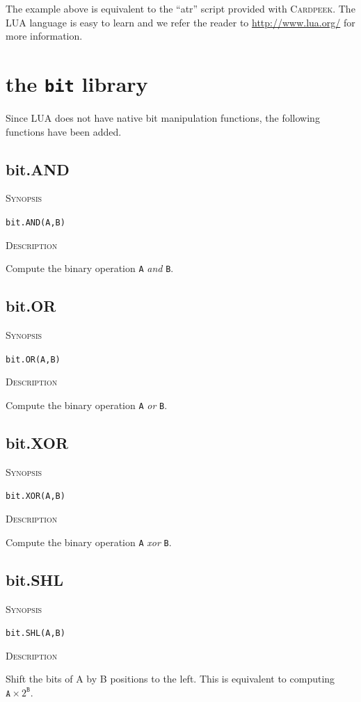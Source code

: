 \documentclass[11pt]{report}
\newcommand{\mansection}[1]{\vspace{0.5em}\par\noindent\textsc{#1}\vspace{0.5em}\par}
\newcommand{\syn}[1]{\texttt{#1}}
\newcommand{\Cardpeek}{\textsc{Cardpeek}}
\begin{document}
The example above is equivalent to the ``atr'' script provided with \Cardpeek.
The LUA language is easy to learn and we refer the reader to \url{http://www.lua.org/} for more information.

\section{the \syn{bit} library}

Since LUA does not have native bit manipulation functions, the following functions have been added.

\subsection{bit.AND}

\mansection{Synopsis}
\syn{bit.AND(A,B)}

\mansection{Description}
Compute the binary operation \syn{A} \textit{and} \syn{B}.

\subsection{bit.OR}

\mansection{Synopsis}
\syn{bit.OR(A,B)}

\mansection{Description}
Compute the binary operation \syn{A} \textit{or} \syn{B}.

\subsection{bit.XOR}

\mansection{Synopsis}
\syn{bit.XOR(A,B)}

\mansection{Description}
  Compute the binary operation \syn{A} \textit{xor} \syn{B}.

\subsection{bit.SHL}

\mansection{Synopsis}
\syn{bit.SHL(A,B)}

\mansection{Description}
  Shift the bits of A by B positions to the left. 
  This is equivalent to computing $\syn{A}{\times}2^{\syn{B}}$.
\end{document}

